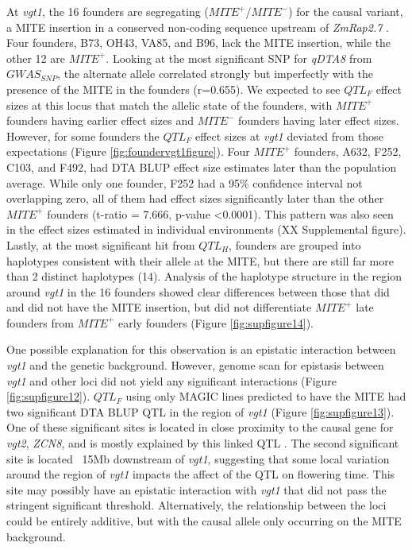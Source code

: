 \documentclass[article,9pt,twocolumn,twoside]{rilabRxiv}
\begin{document}
At \emph{vgt1}, the 16 founders are segregating ($MITE^+$/$MITE^-$) for the causal variant, a MITE insertion in a conserved non-coding sequence upstream of \emph{ZmRap2.7} \citep{Salvi,Castelletti}.
Four founders, B73, OH43, VA85, and B96, lack the MITE insertion, while the other 12 are $MITE^+$.
Looking at the most significant SNP for \emph{qDTA8} from $GWAS_{SNP}$, the alternate allele correlated strongly but imperfectly with the presence of the MITE in the founders (r=0.655).
We expected to see $QTL_F$ effect sizes at this locus that match the allelic state of the founders, with $MITE^+$ founders having earlier effect sizes and $MITE^-$ founders having later effect sizes.
However, for some founders the $QTL_F$ effect sizes at \emph{vgt1} deviated from those expectations (Figure \ref{fig:foundervgt1figure}).
Four $MITE^+$ founders, A632, F252, C103, and F492, had DTA BLUP effect size estimates later than the population average.
While only one founder, F252 had a 95\% confidence interval not overlapping zero, all of them had effect sizes significantly later than the other $MITE^+$ founders (t-ratio = 7.666, p-value <0.0001).
This pattern was also seen in the effect sizes estimated in individual environments (XX Supplemental figure).
Lastly, at the most significant hit from $QTL_H$, founders are grouped into haplotypes consistent with their allele at the MITE, but there are still far more than 2 distinct haplotypes (14).
Analysis of the haplotype structure in the region around \emph{vgt1} in the 16 founders showed clear differences between those that did and did not have the MITE insertion, but did not differentiate $MITE^+$ late founders from $MITE^+$ early founders (Figure \ref{fig:supfigure14}).

One possible explanation for this observation is an epistatic interaction between \emph{vgt1} and the genetic background.
However, genome scan for epistasis between \emph{vgt1} and other loci did not yield any significant interactions (Figure \ref{fig:supfigure12}).
$QTL_F$ using only MAGIC lines predicted to have the MITE had two significant DTA BLUP QTL in the region of \emph{vgt1} (Figure \ref{fig:supfigure13}).
One of these significant sites is located in close proximity to the causal gene for \emph{vgt2}, \emph{ZCN8}, and is mostly explained by this linked QTL \citep{Guo}.
The second significant site is located ~15Mb downstream of \emph{vgt1}, suggesting that some local variation around the region of \emph{vgt1} impacts the affect of the QTL on flowering time.
This site may possibly have an epistatic interaction with \emph{vgt1} that did not pass the stringent significant threshold.
Alternatively, the relationship between the loci could be entirely additive, but with the causal allele only occurring on the MITE background.
\end{document}
